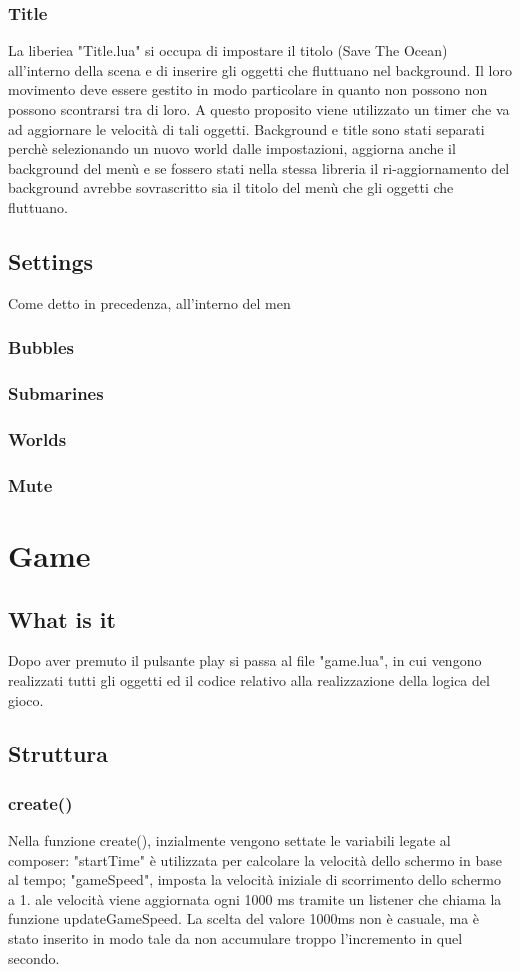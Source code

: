 \documentclass[12pt]{article}
\begin{document}
\subsubsection{Title}
La liberiea "Title.lua" si occupa di impostare il titolo (Save The Ocean) all'interno della scena e di inserire gli oggetti che fluttuano nel background. Il loro movimento deve essere gestito in modo particolare in quanto non possono non possono scontrarsi tra di loro. A questo proposito viene utilizzato un timer che va ad aggiornare le velocità di tali oggetti. Background e title sono stati separati perchè selezionando un nuovo world dalle impostazioni, aggiorna anche il background del menù e se fossero stati nella stessa libreria il ri-aggiornamento del background avrebbe sovrascritto sia il titolo del menù che gli oggetti che fluttuano.
\subsection{Settings}
Come detto in precedenza, all'interno del men
\subsubsection{Bubbles}
\subsubsection{Submarines}
\subsubsection{Worlds}
\subsubsection{Mute}

\section{Game}
\subsection{What is it}
Dopo aver premuto il pulsante play si passa al file "game.lua", in cui vengono realizzati tutti gli oggetti ed il codice relativo 
alla realizzazione della logica del gioco.
\subsection{Struttura}
\subsubsection{create()}
Nella funzione create(), inzialmente vengono settate le variabili legate al composer: "startTime" è utilizzata per calcolare la 
velocità dello schermo in base al tempo; "gameSpeed", imposta la velocità iniziale di scorrimento dello schermo a 1. 
ale velocità viene aggiornata ogni 1000 ms tramite un listener che chiama la funzione updateGameSpeed. 
La scelta del valore 1000ms non è casuale, ma è stato inserito in modo tale da non accumulare troppo l'incremento in quel secondo.
\\
\end{document}
